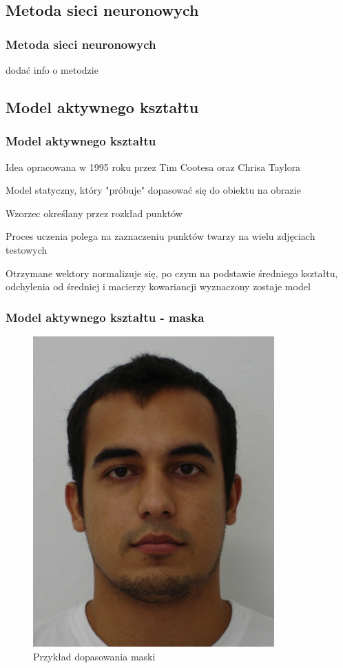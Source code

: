\documentclass[xcolor=table]{beamer}
\begin{document}
\subsection{Metoda sieci neuronowych}
\begin{frame}
  \frametitle{Metoda sieci neuronowych}

  dodać info o metodzie

\end{frame}

\subsection{Model aktywnego kształtu}
\begin{frame}
  \frametitle{Model aktywnego kształtu}
  \begin{itemize}
   {\item Idea opracowana w 1995 roku przez Tim Cootesa oraz Chrisa Taylora}
   {\item Model statyczny, który "próbuje" dopasować się do obiektu na obrazie}
   {\item Wzorzec określany przez rozkład punktów}
   {\item Proces uczenia polega na zaznaczeniu punktów twarzy na wielu zdjęciach testowych}
   {\item Otrzymane wektory normalizuje się, po czym na podstawie średniego kształtu, odchylenia od średniej i macierzy kowariancji wyznaczony zostaje model}
 \end{itemize}
\end{frame}

\begin{frame}
  \frametitle{Model aktywnego kształtu - maska}
\begin{center}
  \begin{figure}
    \includegraphics[scale=0.4]{aktywny2.png}
    \caption{Przykład dopasowania maski}
  \end{figure}
\end{center}
\end{frame}
\end{document}
